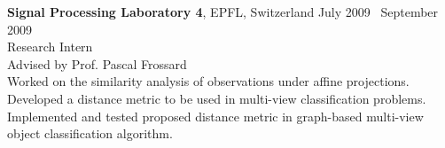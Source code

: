
    \textbf{Signal Processing Laboratory 4}, EPFL, Switzerland \hfill July 2009 \textendash ~September 2009\vspace{0mm}\\\vspace{0mm}
	\hspace{-1mm}Research Intern  \hfill \vspace{0mm}\\\vspace{0mm}
	\hspace{-1mm}Advised by Prof. Pascal Frossard \hfill \vspace{2mm}\\\vspace{0mm}
	\hspace{-1mm}Worked on the similarity analysis of observations under affine projections. Developed a distance metric to be used in multi-view classification problems. Implemented and tested proposed distance metric in graph-based multi-view object classification algorithm.